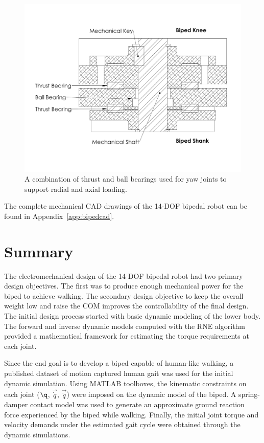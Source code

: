\begin{figure}[!ht]
	\begin{center}
    \includegraphics[trim = 5mm 34mm 5mm 25mm,clip,width=15cm]{fig/design/yawbearing.pdf}
	\end{center}
  \caption{A combination of thrust and ball bearings used for yaw joints to support radial and axial loading.}
\label{fig:yawbearing}
\end{figure}

The complete mechanical CAD drawings of the 14-DOF bipedal robot can be found in Appendix~\ref{app:bipedcad}. 



\section{Summary} %
\label{sec:design_summary}
The electromechanical design of the 14 DOF bipedal robot had two primary design objectives. The first was to produce enough mechanical power for the biped to achieve walking. The secondary design objective to keep the overall weight low and raise the COM improves the controllability of the final design. The initial design process started with basic dynamic modeling of the lower body. The forward and inverse dynamic models computed with the RNE algorithm provided a mathematical framework for estimating the torque requirements at each joint. 

Since the end goal is to develop a biped capable of human-like walking, a published dataset of motion captured human gait was used for the initial dynamic simulation. Using MATLAB toolboxes, the kinematic constraints on each joint ($\q$, $\vec{\dot{q}}$, $\vec{\ddot{q}}$) were imposed on the dynamic model of the biped. A spring-damper contact model was used to generate an approximate ground reaction force experienced by the biped while walking. Finally, the initial joint torque and velocity demands under the estimated gait cycle were obtained through the dynamic simulations. 

